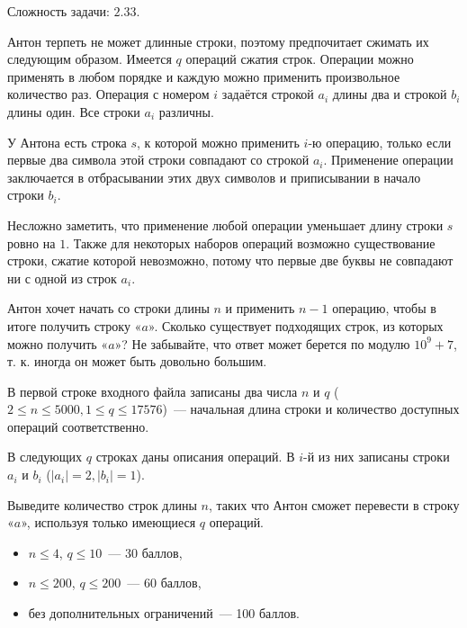 
\Legend
Сложность задачи: $2.33$.

Антон терпеть не может длинные строки, поэтому предпочитает сжимать их следующим образом. Имеется $q$ операций сжатия строк. Операции можно применять в любом порядке и каждую можно применить произвольное количество раз. Операция с номером $i$ задаётся строкой $a_i$ длины два и строкой $b_i$ длины один. Все строки $a_i$ различны.

У Антона есть строка $s$, к которой можно применить $i$-ю операцию, только если первые два символа этой строки совпадают со строкой $a_i$. Применение операции заключается в отбрасывании этих двух символов и приписывании в начало строки $b_i$.

Несложно заметить, что применение любой операции уменьшает длину строки $s$ ровно на $1$. Также для некоторых наборов операций возможно существование строки, сжатие которой невозможно, потому что первые две буквы не совпадают ни с одной из строк $a_i$.

Антон хочет начать со строки длины $n$ и применить $n - 1$ операцию, чтобы в итоге получить строку «$a$». Сколько существует подходящих строк, из которых можно получить «$a$»? Не забывайте, что ответ может берется по модулю $10^9 + 7$, т. к. иногда он может быть довольно большим.

\Input
В первой строке входного файла записаны два числа $n$ и $q$ ($2 \le n \le 5000, 1 \le q \le 17576$)~--- начальная длина строки и количество доступных операций соответственно.

В следующих $q$ строках даны описания операций. В $i$-й из них записаны строки $a_i$ и $b_i$ ($|a_i| = 2, |b_i| = 1$).

\Output
Выведите количество строк длины $n$, таких что Антон сможет перевести в строку «$a$», используя только имеющиеся $q$ операций.

\Samples
\BeginTests
\EndTests

\Scoring
\begin{itemize}
	\item $n \le 4$, $q \le 10$~--- 30 баллов,
	\item $n \le 200$, $q \le 200$~--- 60 баллов,
	\item без дополнительных ограничений~--- 100 баллов.
\end{itemize}

\EndProblem

